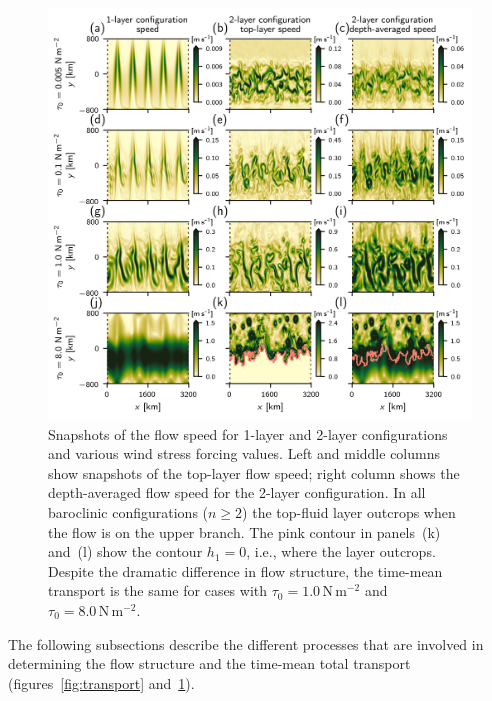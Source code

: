 \documentclass{agujournal2019}
\newcommand{\navidcomment}[1]{{\color{red} [#1]}}
\newcommand{\Pa}		{\mathrm{N}\,\mathrm{m}^{-2}}
\begin{document}
\begin{figure}[t]
\centering
\noindent\includegraphics{snapshots.png}
\vspace*{-1em}
\caption{Snapshots of the flow speed for 1-layer and 2-layer configurations and various wind stress forcing values. Left and middle columns show snapshots of the top-layer flow speed; right column shows the depth-averaged flow speed for the 2-layer configuration. In all baroclinic configurations ($n\ge 2$) the top-fluid layer outcrops when the flow is on the upper branch. The pink contour in panels~(k) and~(l) show the contour $h_1=0$, i.e., where the  layer outcrops. Despite the dramatic difference in flow structure, the time-mean transport is the same for cases with $\tau_0=1.0\,\Pa$ and $\tau_0=8.0\,\Pa$.}\label{fig:snapshots}\vspace*{-3em}
\end{figure}


The following subsections describe the different processes that are involved in determining the flow structure and the time-mean total transport (figures~\ref{fig:transport} and~\ref{fig:snapshots}).
\end{document}
